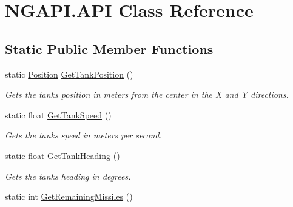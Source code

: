 \hypertarget{class_n_g_a_p_i_1_1_a_p_i}{}\section{N\+G\+A\+P\+I.\+A\+PI Class Reference}
\label{class_n_g_a_p_i_1_1_a_p_i}
\subsection*{Static Public Member Functions}
\begin{DoxyCompactItemize}
\item 
\mbox{\label{class_n_g_a_p_i_1_1_a_p_i_aa2d9caed17f411f77fb61d1256b0d75c}} 
static \hyperlink{struct_n_g_a_p_i_1_1_position}{Position} \hyperlink{class_n_g_a_p_i_1_1_a_p_i_aa2d9caed17f411f77fb61d1256b0d75c}{Get\+Tank\+Position} ()
\begin{DoxyCompactList}\small\item\em Gets the tank\textquotesingle{}s position in meters from the center in the X and Y directions. \end{DoxyCompactList}\item 
\mbox{\label{class_n_g_a_p_i_1_1_a_p_i_ad901bdd1f872b2c13a4e2b1cca5e7d5d}} 
static float \hyperlink{class_n_g_a_p_i_1_1_a_p_i_ad901bdd1f872b2c13a4e2b1cca5e7d5d}{Get\+Tank\+Speed} ()
\begin{DoxyCompactList}\small\item\em Gets the tank\textquotesingle{}s speed in meters per second. \end{DoxyCompactList}\item 
\mbox{\label{class_n_g_a_p_i_1_1_a_p_i_ac3e50a4e2991c7beba3b03b9c542b126}} 
static float \hyperlink{class_n_g_a_p_i_1_1_a_p_i_ac3e50a4e2991c7beba3b03b9c542b126}{Get\+Tank\+Heading} ()
\begin{DoxyCompactList}\small\item\em Gets the tank\textquotesingle{}s heading in degrees. \end{DoxyCompactList}\item 
\mbox{\label{class_n_g_a_p_i_1_1_a_p_i_aebf82b1209f606133c0413234eb81661}} 
static int \hyperlink{class_n_g_a_p_i_1_1_a_p_i_aebf82b1209f606133c0413234eb81661}{Get\+Remaining\+Missiles} ()

\end{DoxyCompactItemize}
